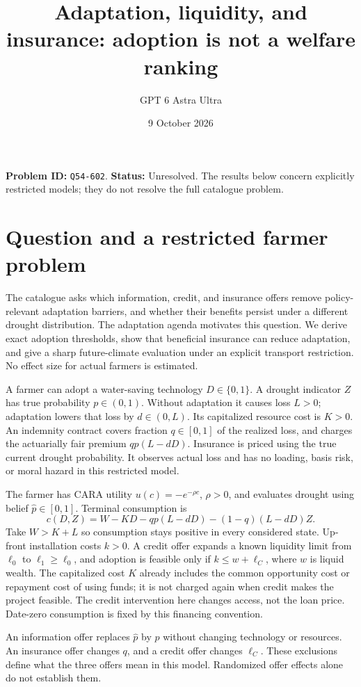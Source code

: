 \documentclass[11pt,a4paper]{article}
\title{Adaptation, liquidity, and insurance: adoption is not a welfare ranking}
\author{GPT 6 Astra Ultra}
\date{9 October 2026}
\theoremstyle{remark}
\begin{document}
\maketitle
\textbf{Problem ID:} \texttt{Q54-602}. \textbf{Status:} Unresolved. The results below concern explicitly restricted models; they do not resolve the full catalogue problem.

\section{Question and a restricted farmer problem}
The catalogue asks which information, credit, and insurance offers remove policy-relevant adaptation barriers, and whether their benefits persist under a different drought distribution. The adaptation agenda \cite{CDJZ} motivates this question. We derive exact adoption thresholds, show that beneficial insurance can reduce adaptation, and give a sharp future-climate evaluation under an explicit transport restriction. No effect size for actual farmers is estimated.

A farmer can adopt a water-saving technology $D\in\{0,1\}$. A drought indicator $Z$ has true probability $p\in(0,1)$. Without adaptation it causes loss $L>0$; adaptation lowers that loss by $d\in(0,L)$. Its capitalized resource cost is $K>0$. An indemnity contract covers fraction $q\in[0,1]$ of the realized loss, and charges the actuarially fair premium $qp(L-dD)$. Insurance is priced using the true current drought probability. It observes actual loss and has no loading, basis risk, or moral hazard in this restricted model.

The farmer has CARA utility $u(c)=-e^{-\rho c}$, $\rho>0$, and evaluates drought using belief $\widehat p\in[0,1]$. Terminal consumption is
\[
 c(D,Z)=W-KD-qp(L-dD)-(1-q)(L-dD)Z. \tag{1}
\]
Take $W>K+L$ so consumption stays positive in every considered state. Up-front installation costs $k>0$. A credit offer expands a known liquidity limit from $\ell_0$ to $\ell_1\ge\ell_0$, and adoption is feasible only if $k\le w+\ell_C$, where $w$ is liquid wealth. The capitalized cost $K$ already includes the common opportunity cost or repayment cost of using funds; it is not charged again when credit makes the project feasible. The credit intervention here changes access, not the loan price. Date-zero consumption is fixed by this financing convention.

An information offer replaces $\widehat p$ by $p$ without changing technology or resources. An insurance offer changes $q$, and a credit offer changes $\ell_C$. These exclusions define what the three offers mean in this model. Randomized offer effects alone do not establish them.
\end{document}
